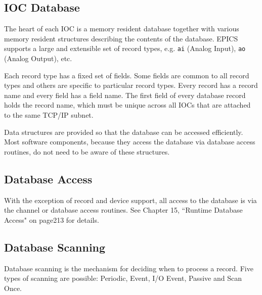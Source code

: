 \subsection{IOC Database}

The heart of each IOC is a memory resident database together with various memory resident structures describing the 
contents of the database. EPICS supports a large and extensible set of record types, e.g. \verb|ai| (Analog Input), \verb|ao| (Analog 
Output), etc.

Each record type has a fixed set of fields. Some fields are common to all record types and others are specific to particular 
record types. Every record has a record name and every field has a field name. The first field of every database record 
holds the record name, which must be unique across all IOCs that are attached to the same TCP/IP subnet.

Data structures are provided so that the database can be accessed efficiently. Most software components, because they 
access the database via database access routines, do not need to be aware of these structures.

\subsection{Database Access}

With the exception of record and device support, all access to the database is via the channel or database access routines. 
See Chapter 15, ``Runtime Database Access" on page213 for details.

\subsection{Database Scanning}

Database scanning is the mechanism for deciding when to process a record. Five types of scanning are possible: Periodic, 
Event, I/O Event, Passive and Scan Once.

